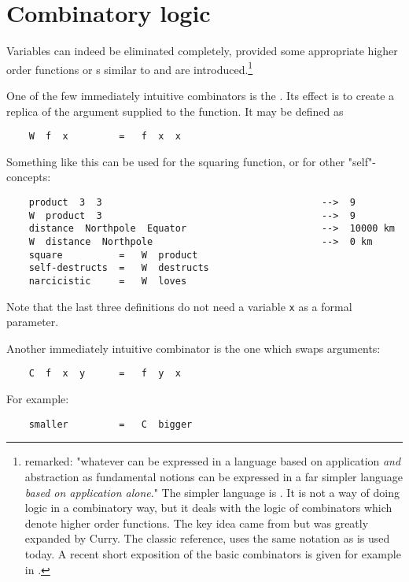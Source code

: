 \section{Combinatory logic}
\par
Variables can indeed be eliminated completely,
provided some appropriate higher order functions
or s similar to  and 
are introduced.\footnote{
remarked:
"whatever can be expressed in a language based on application
{\em and} abstraction as fundamental notions
can be expressed in a far simpler language
{\em based on application alone}."
The simpler language is .
It is not a way of doing logic in a combinatory way,
but it deals with the logic of combinators
which denote higher order functions.
The key idea came from
but was greatly expanded by Curry.
The classic reference,
uses the same notation as is used today.
A recent short exposition of the basic combinators is given for example in
.
}
\par
One of the few immediately intuitive combinators is the
.
Its effect is to create a replica of the argument supplied to the function.
It may be defined as
\begin{verbatim}
    W  f  x         =   f  x  x
\end{verbatim}
Something like this can be used for the squaring function,
or for other "self"-concepts:
\begin{verbatim}
    product  3  3                                       -->  9
    W  product  3                                       -->  9
    distance  Northpole  Equator                        -->  10000 km
    W  distance  Northpole                              -->  0 km
    square          =   W  product
    self-destructs  =   W  destructs
    narcicistic     =   W  loves
\end{verbatim}
Note that the last three definitions do not need a variable \verb#x#
as a formal parameter.
\par
Another immediately intuitive combinator is the one
which swaps arguments:
\begin{verbatim}
    C  f  x  y      =   f  y  x
\end{verbatim}
For example:
\begin{verbatim}
    smaller         =   C  bigger
\end{verbatim}
\par
